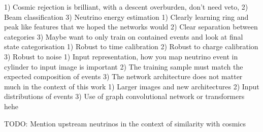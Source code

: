 1) Cosmic rejection is brilliant, with a descent overburden, don't need veto,
2) Beam classification
3) Neutrino energy estimation
1) Clearly learning ring and peak like features that we hoped the networks would
2) Clear separation between categories
3) Maybe want to only train on contained events and look at final state categorisation
1) Robust to time calibration
2) Robust to charge calibration
3) Robust to noise
1) Input representation, how you map neutrino event in cylinder to input image is important
2) The training sample must match the expected composition of events
3) The network architecture does not matter much in the context of this work
1) Larger images and new architectures
2) Input distributions of events
3) Use of graph convolutional network or transformers hehe

TODO: Mention upstream neutrinos in the context of similarity with cosmics